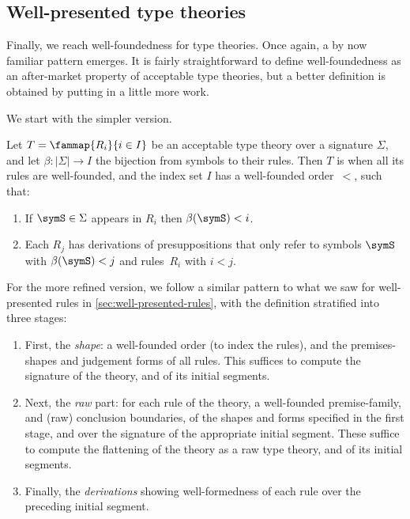 \subsection{Well-presented type theories}
\label{sec:well-presented-theories}

Finally, we reach well-foundedness for type theories.
%
Once again, a by now familiar pattern emerges.
%
It is fairly straightforward to define well-foundedness as an after-market property of acceptable type theories,
%
but a better definition is obtained by putting in a little more work.

We start with the simpler version.

\begin{definition}
  \label{def:well-founded-theory}%
  Let $T = \fammap{R_i}{i \in I}$ be an acceptable type theory over a signature $\Sigma$, and let $\beta : |\Sigma| \to I$ the bijection from symbols to their rules.
  Then $T$ is  when all its rules are well-founded, and the index set $I$ has a well-founded order~$<$, such that:
  \begin{enumerate}
  \item If $\symS \in \Sigma$ appears in $R_i$ then $\beta(\symS) < i$.
  \item Each $R_j$ has derivations of presuppositions that only refer to symbols $\symS$ with $\beta(\symS) < j$ and rules~$R_i$ with $i < j$.
  \end{enumerate}
\end{definition}

For the more refined version, we follow a similar pattern to what we saw for well-presented rules in \cref{sec:well-presented-rules}, with the definition stratified into three stages:

\begin{enumerate}
  \item First, the \emph{shape}: a well-founded order (to index the rules), and the premises-shapes and judgement forms of all rules.
  This suffices to compute the signature of the theory, and of its initial segments.
  
  \item Next, the \emph{raw} part: for each rule of the theory, a well-founded premise-family, and (raw) conclusion boundaries, of the shapes and forms specified in the first stage, and over the signature of the appropriate initial segment.
  These suffice to compute the flattening of the theory as a raw type theory, and of its initial segments.

  \item Finally, the \emph{derivations} showing well-formedness of each rule over the preceding initial segment.
\end{enumerate}


